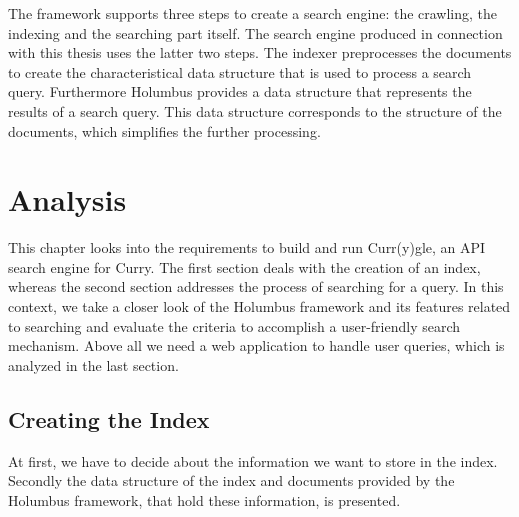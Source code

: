 \documentclass[%
	pdftex,%
	a4paper,%
	oneside,%
	chapterprefix,%
	headsepline,%
	12pt%
]{scrbook}
\begin{document}
The framework supports three steps to create a search engine: the
crawling, the indexing and the searching part itself. The search
engine produced in connection with this thesis uses the latter two steps. The
indexer preprocesses the documents to create the characteristical data
structure that is used to process a search query. Furthermore Holumbus
provides a data structure that represents the results of a search
query. This data structure corresponds to the structure of the
documents, which simplifies the further processing.\\

\chapter{Analysis}\label{analysis}
This chapter looks into the requirements to build and run Curr(y)gle, an API search
engine for Curry. The first section deals with the creation of an
index, whereas the second section addresses the process of searching
for a query. In this context, we take a closer look of the Holumbus
framework and its features related to searching and evaluate the criteria
to accomplish a user-friendly search mechanism. Above all we need a web
application to handle user queries, which is analyzed in the last
section.




\section{Creating the Index}
At first, we have to decide about the information we want to store in
the index. Secondly the data structure of the index and documents
provided by the Holumbus framework, that hold
these information, is presented.\\
\end{document}
